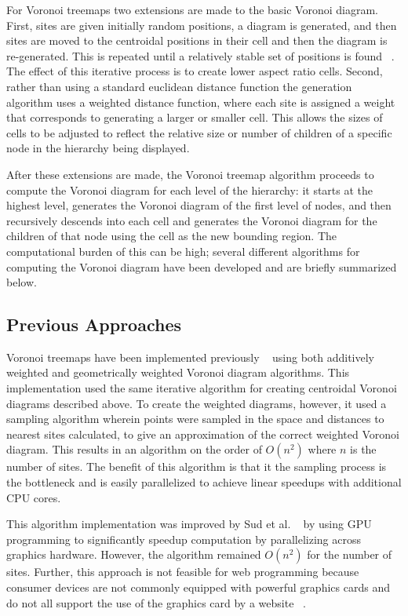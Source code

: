 \documentclass{acm_proc_article-sp}
\begin{document}
For Voronoi treemaps two extensions are made to the basic Voronoi
diagram. First, sites are given initially random positions, a diagram
is generated, and then sites are moved to the centroidal positions in
their cell and then the diagram is re-generated. This is repeated
until a relatively stable set of positions is found ~\cite{lloyd}. The
effect of this iterative process is to create lower aspect ratio
cells. Second, rather than using a standard euclidean distance
function the generation algorithm uses a weighted distance function,
where each site is assigned a weight that corresponds to generating a
larger or smaller cell. This allows the sizes of cells to be adjusted
to reflect the relative size or number of children of a specific node
in the hierarchy being displayed.

After these extensions are made, the Voronoi treemap algorithm
proceeds to compute the Voronoi diagram for each level of the
hierarchy: it starts at the highest level, generates the Voronoi
diagram of the first level of nodes, and then recursively descends
into each cell and generates the Voronoi diagram for the children of
that node using the cell as the new bounding region. The computational
burden of this can be high; several different algorithms for computing
the Voronoi diagram have been developed and are briefly summarized
below.

\subsection{Previous Approaches}
Voronoi treemaps have been implemented previously
~\cite{balzer:treemaps} using both additively weighted and
geometrically weighted Voronoi diagram algorithms. This implementation
used the same iterative algorithm for creating centroidal Voronoi
diagrams described above. To create the weighted diagrams, however, it
used a sampling algorithm wherein points were sampled in the space and
distances to nearest sites calculated, to give an approximation of the
correct weighted Voronoi diagram. This results in an algorithm on the
order of $O(n^2)$ where $n$ is the number of sites. The benefit of
this algorithm is that it the sampling process is the bottleneck and
is easily parallelized to achieve linear speedups with additional CPU
cores.

This algorithm implementation was improved by Sud et
al. ~\cite{sud:fast} by using GPU programming to significantly speedup
computation by parallelizing across graphics hardware. However, the
algorithm remained $O(n^2)$ for the number of sites. Further, this
approach is not feasible for web programming because consumer devices
are not commonly equipped with powerful graphics cards and do not all
support the use of the graphics card by a website ~\cite{needed}.
\end{document}
